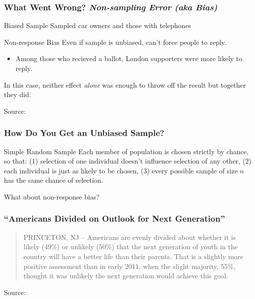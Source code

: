 \documentclass{beamer}
\begin{document}
\begin{frame}
\frametitle{What Went Wrong? \emph{Non-sampling Error (aka Bias)}}
	\begin{block}{Biased Sample}
		Sampled car owners and those with telephones
	\end{block}
	
	\begin{block}{Non-response Bias}
	Even if sample is unbiased, can't force people to reply.
		\begin{itemize}
			\item Among those who recieved a ballot, Landon supporters were more likely to reply.
		\end{itemize}
	\end{block}
	\alert{In this case, neither effect \emph{alone} was enough to throw off the result but together 		they did.}
	
	\tiny{Source: \href{http://www.jstor.org/stable/10.2307/2749114}{}}
\end{frame}

\begin{frame}
\frametitle{How Do You Get an Unbiased Sample?}
	\begin{block}{Simple Random Sample}	
		Each member of population is chosen strictly by chance, so that: (1) selection of one 					individual doesn't influence selection of any other, (2) each individual is just as likely to be 			chosen, (3) every possible sample of size $n$ has the same chance of selection.	
	\end{block}
	
	\begin{block}{What about non-response bias?}
	\end{block}
\end{frame}

\begin{frame}
\frametitle{``Americans Divided on Outlook for Next Generation''}
	\vspace{1em}
	\begin{quote}
		PRINCETON, NJ -- Americans are evenly divided about whether it is likely (49\%) or unlikely 			(50\%) that the next generation of youth in the country will have a better life than their 				parents. That is a slightly more positive assessment than in early 2011, when the slight 				majority, 55\%, thought it was unlikely the next generation would achieve this goal.
	\end{quote}
	\tiny{Source: \href{http://www.gallup.com/poll/159737/americans-divided-outlook-next-generation.aspx}{}}	
\end{frame}
\end{document}
